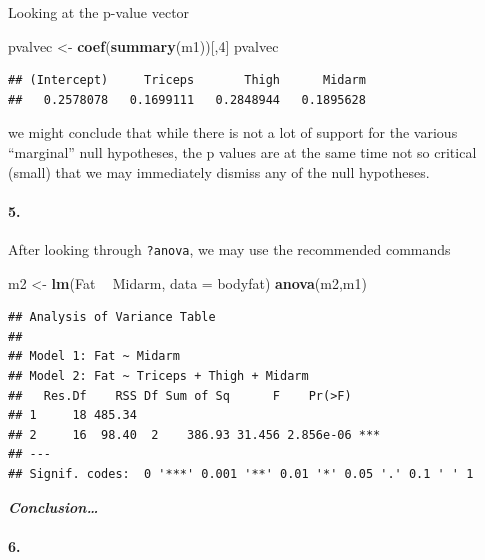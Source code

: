 \documentclass[
]{article}
\newenvironment{Shaded}{\begin{snugshade}}{\end{snugshade}}
\newcommand{\DataTypeTok}[1]{\textcolor[rgb]{0.13,0.29,0.53}{#1}}
\newcommand{\DecValTok}[1]{\textcolor[rgb]{0.00,0.00,0.81}{#1}}
\newcommand{\KeywordTok}[1]{\textcolor[rgb]{0.13,0.29,0.53}{\textbf{#1}}}
\newcommand{\NormalTok}[1]{#1}
\newcommand{\OperatorTok}[1]{\textcolor[rgb]{0.81,0.36,0.00}{\textbf{#1}}}
\newcommand{\StringTok}[1]{\textcolor[rgb]{0.31,0.60,0.02}{#1}}
\begin{document}
Looking at the p-value vector

\begin{Shaded}
\begin{Highlighting}[]
\NormalTok{pvalvec <-}\StringTok{ }\KeywordTok{coef}\NormalTok{(}\KeywordTok{summary}\NormalTok{(m1))[,}\DecValTok{4}\NormalTok{]}
\NormalTok{pvalvec}
\end{Highlighting}
\end{Shaded}

\begin{verbatim}
## (Intercept)     Triceps       Thigh      Midarm 
##   0.2578078   0.1699111   0.2848944   0.1895628
\end{verbatim}

we might conclude that while there is not a lot of support for the
various ``marginal'' null hypotheses, the p values are at the same time
not so critical (small) that we may immediately dismiss any of the null
hypotheses.

\hypertarget{section-67}{%
\paragraph{\texorpdfstring{\textbf{5.}}{5.}}\label{section-67}}

After looking through \texttt{?anova}, we may use the recommended
commands

\begin{Shaded}
\begin{Highlighting}[]
\NormalTok{m2 <-}\StringTok{ }\KeywordTok{lm}\NormalTok{(Fat }\OperatorTok{~}\StringTok{ }\NormalTok{Midarm, }\DataTypeTok{data =}\NormalTok{ bodyfat)}
\KeywordTok{anova}\NormalTok{(m2,m1)}
\end{Highlighting}
\end{Shaded}

\begin{verbatim}
## Analysis of Variance Table
## 
## Model 1: Fat ~ Midarm
## Model 2: Fat ~ Triceps + Thigh + Midarm
##   Res.Df    RSS Df Sum of Sq      F    Pr(>F)    
## 1     18 485.34                                  
## 2     16  98.40  2    386.93 31.456 2.856e-06 ***
## ---
## Signif. codes:  0 '***' 0.001 '**' 0.01 '*' 0.05 '.' 0.1 ' ' 1
\end{verbatim}

\textbf{\emph{Conclusion\ldots{}}}

\hypertarget{section-68}{%
\paragraph{\texorpdfstring{\textbf{6.}}{6.}}\label{section-68}}
\end{document}
